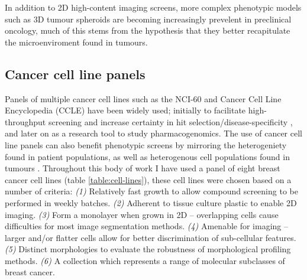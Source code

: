 \documentclass[a4paper,11pt,twoside,openright]{scrbook}
\begin{document}
In addition to 2D high-content imaging screens, more complex phenotypic models such as 3D tumour spheroids are becoming increasingly prevelent in preclinical oncology, much of this stems from the hypothesis that they better recapitulate the microenviroment found in tumours.

\subsection{Cancer cell line panels}
Panels of multiple cancer cell lines such as the NCI-60 and Cancer Cell Line Encyclopedia (CCLE) have been widely used; initially to facilitate high-throughput screening and increase certainty in hit selection/disease-specificity \cite{Wu1992,Shoemaker2006}, and later on as a research tool to study pharmacogenomics. \cite{Heiser2012,Abaan2013,Jaeger2015}
The use of cancer cell line panels can also benefit phenotypic screens by mirroring the heterogeniety found in patient populations, as well as heterogenous cell populations found in tumours \cite{Caie2010}.
Throughout this body of work I have used a panel of eight breast cancer cell lines (table \ref{table:cell-lines}), these cell lines were chosen based on a number of criteria:
\textit{(1)} Relatively fast growth to allow compound screening to be performed in weekly batches.
\textit{(2)} Adherent to tissue culture plastic to enable 2D imaging.
\textit{(3)} Form a monolayer when grown in 2D -- overlapping cells cause difficulties for most image segmentation methods.
\textit{(4)} Amenable for imaging -- larger and/or flatter cells allow for better discrimination of sub-cellular features.
\textit{(5)} Distinct morphologies to evaluate the robustness of morphological profiling methods.
\textit{(6)} A collection which represents a range of molecular subclasses of breast cancer.
\end{document}
